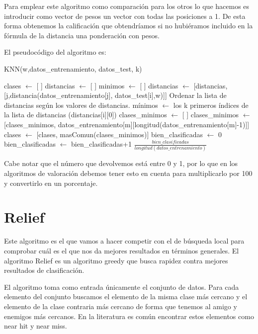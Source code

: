 \documentclass[12pt,a4paper]{article}
\begin{document}
	Para emplear este algoritmo como comparación para los otros lo que hacemos es introducir como vector de pesos un vector con todas las posiciones a 1. De esta forma obtenemos la calificación que obtendríamos si no hubiéramos incluido en la fórmula de la distancia una ponderación con pesos.
	
	El pseudocódigo del algoritmo es:
	\begin{algorithm}
		\caption{KNN(w,datos\_entrenamiento, datos\_test, k)}
		\begin{algorithmic}
			\STATE clases $\leftarrow$ [ ]
				\STATE distancias $\leftarrow$ [ ]
				\STATE minimos $\leftarrow$ [ ]
						\STATE distancias $\leftarrow$ [distancias,[j,distancia(datos\_entrenamiento[j], datos\_test[i],w)]]
					\ENDIF
					\STATE Ordenar la lista de distancias según los valores de distancias.
					\STATE mínimos $\leftarrow$ los k primeros índices de la lista de distancias (distancias[i][0])
					\STATE clases\_minimos $\leftarrow$ [ ]
						\STATE clases\_minimos $\leftarrow$ [clases\_minimos, datos\_entrenamiento[m][longitud(datos\_entrenamiento[m]-1)]]
					\STATE clases $\leftarrow$ [clases, masComun(clases\_minimos)]
					\ENDFOR
				\ENDFOR
			\ENDFOR
			\STATE bien\_clasificadas $\leftarrow$ 0
					\STATE bien\_clasificadas $\leftarrow$ bien\_clasificadas+1
				\ENDIF
			\ENDFOR
			\RETURN $\frac{bien\_clasificadas}{longitud(datos\_entrenamiento)}$
		\end{algorithmic}
	\end{algorithm}
	
	Cabe notar que el número que devolvemos está entre 0 y 1, por lo que en los algoritmos de valoración debemos tener esto en cuenta para multiplicarlo por 100 y convertirlo en un porcentaje.

	\section{Relief}
	\label{sec:relief}

	Este algoritmo es el que vamos a hacer competir con el de búsqueda local para comprobar cuál es el que nos da mejores resultados en términos generales. El algoritmo Relief es un algoritmo greedy que busca rapidez contra mejores resultados de clasificación.
	
	El algoritmo toma como entrada únicamente el conjunto de datos. Para cada elemento del conjunto buscamos el elemento de la misma clase más cercano y el elemento de la clase contraria más cercano de forma que tenemos al amigo y enemigos más cercanos. En la literatura es común encontrar estos elementos como near hit y near miss.
	
\end{document}
